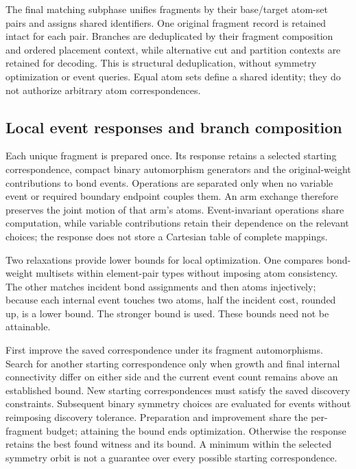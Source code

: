\label{sec:reduction-details}
The final matching subphase unifies fragments by their base/target atom-set pairs and assigns shared identifiers. One original fragment record is retained intact for each pair. Branches are deduplicated by their fragment composition and ordered placement context, while alternative cut and partition contexts are retained for decoding. This is structural deduplication, without symmetry optimization or event queries. Equal atom sets define a shared identity; they do not authorize arbitrary atom correspondences.

\subsection{Local event responses and branch composition}
\label{sec:decoding-details}

Each unique fragment is prepared once. Its response retains a selected starting correspondence, compact binary automorphism generators and the original-weight contributions to bond events. Operations are separated only when no variable event or required boundary endpoint couples them. An arm exchange therefore preserves the joint motion of that arm's atoms. Event-invariant operations share computation, while variable contributions retain their dependence on the relevant choices; the response does not store a Cartesian table of complete mappings.

Two relaxations provide lower bounds for local optimization. One compares bond-weight multisets within element-pair types without imposing atom consistency. The other matches incident bond assignments and then atoms injectively; because each internal event touches two atoms, half the incident cost, rounded up, is a lower bound. The stronger bound is used. These bounds need not be attainable.

First improve the saved correspondence under its fragment automorphisms. Search for another starting correspondence only when growth and final internal connectivity differ on either side and the current event count remains above an established bound. New starting correspondences must satisfy the saved discovery constraints. Subsequent binary symmetry choices are evaluated for events without reimposing discovery tolerance. Preparation and improvement share the per-fragment budget; attaining the bound ends optimization. Otherwise the response retains the best found witness and its bound. A minimum within the selected symmetry orbit is not a guarantee over every possible starting correspondence.

